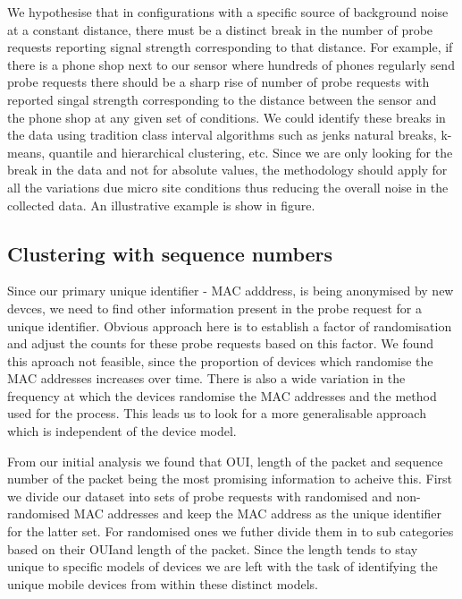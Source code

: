 We hypothesise that in configurations with a specific source of background noise at a constant distance, there must be a distinct break in the number of probe requests reporting signal strength corresponding to that distance.
For example, if there is a phone shop next to our sensor where hundreds of phones regularly send probe requests there should be a sharp rise of number of probe requests with reported singal strength corresponding to the distance between the sensor and the phone shop at any given set of conditions.
We could identify these breaks in the data using tradition class interval algorithms such as jenks natural breaks, k-means, quantile and hierarchical clustering, etc.
Since we are only looking for the break in the data and not for absolute values, the methodology should apply for all the variations due micro site conditions thus reducing the overall noise in the collected data.
An illustrative example is show in figure.

\subsection{Clustering with sequence numbers}

Since our primary unique identifier - MAC adddress, is being anonymised by new devces, we need to find other information present in the probe request for a unique identifier.
Obvious approach here is to establish a factor of randomisation and adjust the counts for these probe requests based on this factor.
We found this aproach not feasible, since the proportion of devices which randomise the MAC addresses increases over time.
There is also a wide variation in the frequency at which the devices randomise the MAC addresses and the method used for the process.
This leads us to look for a more generalisable approach which is independent of the device model.

From our initial analysis we found that OUI, length of the packet and sequence number of the packet being the most promising information to acheive this.
First we divide our dataset into sets of probe requests with randomised and non-randomised MAC addresses and keep the MAC address as the unique identifier for the latter set. 
For randomised ones we futher divide them in to sub categories based on their OUIand length of the packet.
Since the length tends to stay unique to specific models of devices we are left with the task of identifying the unique mobile devices from within these distinct models.

